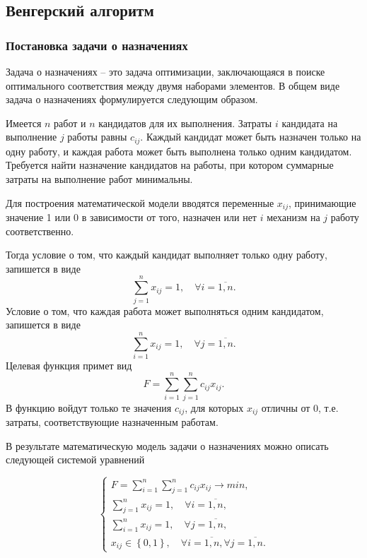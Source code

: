 \documentclass[14pt,a4paper]{extarticle}
\begin{document}
\subsection{Венгерский алгоритм} \label{Hang}
\subsubsection*{Постановка задачи о назначениях}
Задача о назначениях\cite{Assignment} -- это задача оптимизации, заключающаяся в поиске оптимального соответствия между двумя наборами элементов. В общем виде задача о назначениях формулируется следующим образом. 

Имеется $n$ работ и $n$ кандидатов для их выполнения. Затраты $i$ кандидата на выполнение $j$ работы равны $c_{ij}$. Каждый кандидат может быть назначен только на одну работу, и каждая работа может быть выполнена только одним кандидатом. Требуется найти назначение кандидатов на работы, при котором суммарные затраты на выполнение работ минимальны. 

Для построения математической модели вводятся переменные $x_{ij}$, принимающие значение 1 или 0 в зависимости от того, назначен или нет $i$ механизм на $j$ работу соответственно.

Тогда условие о том, что каждый кандидат выполняет только одну работу, запишется в виде 
\begin{equation}
\sum_{j=1}^{n} x_{ij} = 1, \quad \forall i = \overline{1,n}.
\end{equation}
Условие о том, что каждая работа может выполняться одним кандидатом, запишется в виде
\begin{equation}
\sum_{i=1}^{n} x_{ij} = 1, \quad \forall j = \overline{1,n}.
\end{equation}
Целевая функция примет вид
\begin{equation}
F = \sum_{i=1}^{n}\sum_{j=1}^{n} c_{ij} x_{ij}.
\end{equation}
В функцию войдут только те значения $c_{ij}$, для которых $x_{ij}$ отличны от 0, т.е. затраты, соответствующие назначенным работам.

В результате математическую модель задачи о назначениях можно описать следующей системой уравнений

\vspace*{-0.2cm}
\begin{equation}
  \left\{\begin{array}{l}
	F = \sum_{i=1}^{n}\sum_{j=1}^{n} c_{ij} x_{ij} \longrightarrow min,\\
	\sum_{j=1}^{n} x_{ij} = 1, \quad \forall i = \overline{1,n},\\
	\sum_{i=1}^{n} x_{ij} = 1, \quad \forall j = \overline{1,n},\\
	x_{ij} \in \left\{0, 1\right\}, \quad \forall i = \overline{1,n}, \forall j = \overline{1,n}.
	\end{array}\right.
\end{equation}
\end{document}
